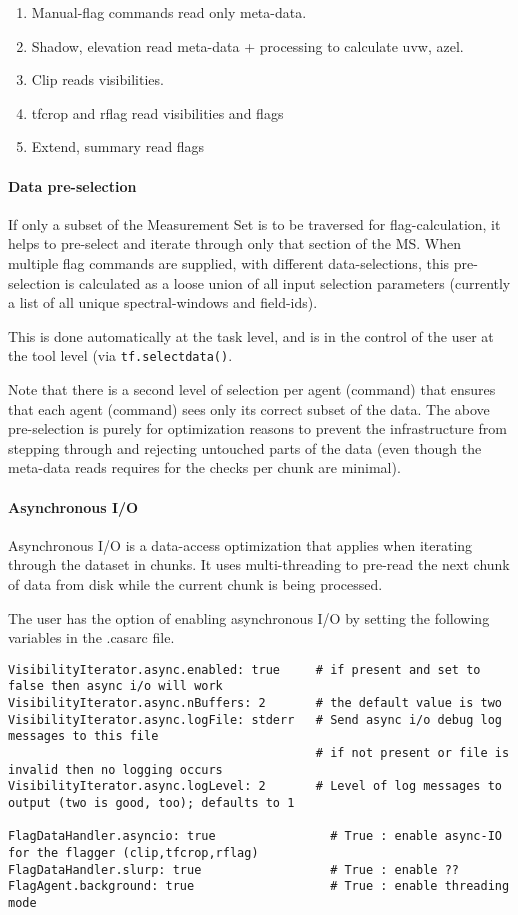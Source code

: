 \begin{enumerate}
\item  Manual-flag commands read only meta-data.
\item  Shadow, elevation read meta-data + processing to calculate uvw, azel.
\item  Clip reads visibilities.
\item  tfcrop and rflag read visibilities and flags
\item Extend, summary read flags
\end{enumerate}



\paragraph{Data pre-selection}
If only a subset of the Measurement Set is to be traversed for flag-calculation,
it helps to pre-select and iterate through only that section of the MS.  
When multiple flag commands are supplied, with different data-selections, 
this pre-selection is calculated as a loose union of all input selection parameters
(currently a list of all unique spectral-windows and field-ids).

This is done automatically at the task level, and is in the control of the user at the 
tool level (via {\tt tf.selectdata()}.

Note that there is a second level of selection per agent (command) that ensures
that each agent (command) sees only its correct subset of the data. 
The above pre-selection is purely for optimization reasons to prevent the infrastructure
from stepping through and rejecting untouched parts of the data (even though the
meta-data reads requires for the checks per chunk are minimal). 

\paragraph{Asynchronous I/O}
Asynchronous I/O is a data-access optimization that applies when iterating through the
dataset in chunks.  It uses multi-threading to pre-read the next chunk of data from disk
while the current chunk is being processed.

The user has the option of enabling asynchronous I/O by setting the following 
variables in the .casarc file. 

\begin{verbatim}
VisibilityIterator.async.enabled: true     # if present and set to false then async i/o will work
VisibilityIterator.async.nBuffers: 2       # the default value is two
VisibilityIterator.async.logFile: stderr   # Send async i/o debug log messages to this file
                                           # if not present or file is invalid then no logging occurs
VisibilityIterator.async.logLevel: 2       # Level of log messages to output (two is good, too); defaults to 1

FlagDataHandler.asyncio: true                # True : enable async-IO for the flagger (clip,tfcrop,rflag)
FlagDataHandler.slurp: true                  # True : enable ??
FlagAgent.background: true                   # True : enable threading mode
\end{verbatim}

